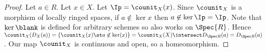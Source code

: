 \begin{proof}
Let $a \in R$.
Let $x\in X$.
Let $\Ip = \counit_X(x)$.
Since $\counit_X$ is a morphism of locally ringed spaces,
if $a\not\in \ker{x}$ then $a\not \in \ker{\Ip} = \Ip$.
Note that $\ker{\blank}$ is defined for arbitrary schemes so also works on $\Spec{R}$.
Hence
$\counit_X(D_X(a))= \{\counit_X(x) \st a\not\in \ker(x)\} = \counit_X(X) \intersect D_{\Spec R}(a) = D_{\Spec R}(a)$.
Our map $\counit_X$ is continuous and open, so a homeomorphism.
\end{proof}